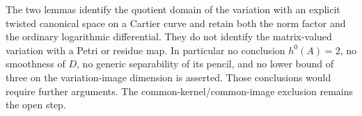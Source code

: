 \begin{remark}
\label{rem:DE-A3-positive-norm-pencil-scope-candidate}
The two lemmas identify the quotient domain of the variation with an
explicit twisted canonical space on a Cartier curve and retain both
the norm factor and the ordinary logarithmic differential. They do
not identify the matrix-valued variation with a Petri or residue map.
In particular no conclusion $h^0(A)=2$, no smoothness of $D$, no
generic separability of its pencil, and no lower bound of three on
the variation-image dimension is asserted. Those conclusions would
require further arguments. The common-kernel/common-image exclusion
remains the open step.
\end{remark}
